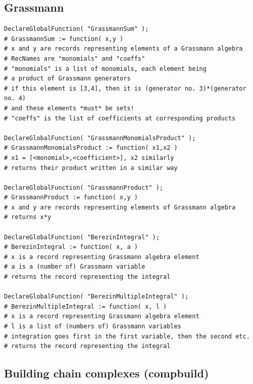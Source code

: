 \documentclass{article}
\begin{document}
\subsection{Grassmann}

\begin{verbatim}
DeclareGlobalFunction( "GrassmannSum" );
# GrassmannSum := function( x,y )
# x and y are records representing elements of a Grassmann algebra
# RecNames are "monomials" and "coeffs"
# "monomials" is a list of monomials, each element being 
# a product of Grassmann generators
# if this element is [3,4], then it is (generator no. 3)*(generator no. 4)
# and these elements *must* be sets!
# "coeffs" is the list of coefficients at corresponding products

DeclareGlobalFunction( "GrassmannMonomialsProduct" );
# GrassmannMonomialsProduct := function( x1,x2 )
# x1 = [<monomial>,<coefficient>], x2 similarly
# returns their product written in a similar way

DeclareGlobalFunction( "GrassmannProduct" );
# GrassmannProduct := function( x,y )
# x and y are records representing elements of Grassmann algebra
# returns x*y

DeclareGlobalFunction( "BerezinIntegral" );
# BerezinIntegral := function( x, a )
# x is a record representing Grassmann algebra element
# a is a (number of) Grassmann variable
# returns the record representing the integral

DeclareGlobalFunction( "BerezinMultipleIntegral" );
# BerezinMultipleIntegral := function( x, l )
# x is a record representing Grassmann algebra element
# l is a list of (numbers of) Grassmann variables
# integration goes first in the first variable, then the second etc.
# returns the record representing the integral
\end{verbatim}

\subsection{Building chain complexes (compbuild)}
\end{document}
